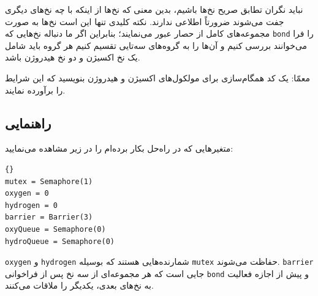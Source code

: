 \documentclass{book}
\newcommand{\clearemptydoublepage}{\newpage\cleardoublepage}
\begin{document}
    نباید نگران تطابق صریح نخ‌ها باشیم،‌ بدین معنی که نخ‌ها  از اینکه با چه نخ‌های دیگری جفت می‌شوند ضرورتاً  اطلاعی ندارند. نکته کلیدی تنها این است 
    نخ‌ها به صورت مجموعه‌های کامل از حصار عبور می‌نمایند؛ بنابراین اگر ما دنباله نخ‌هایی که {\tt bond} را فرا می‌خوانند بررسی کنیم و آن‌ها را به گروه‌های 
    سه‌تایی تقسیم کنیم هر گروه باید شامل یک نخ اکسیژن و دو نخ هیدروژن باشد. 

    معمّا:‌ یک کد همگام‌سازی برای مولکول‌های اکسیژن و هیدروژن بنویسید که این شرایط را برآورده نمایند. 


\clearemptydoublepage
\subsection {راهنمایی }

    متغیرهایی که در راه‌حل بکار برده‌ام را در زیر مشاهده می‌نمایید:

\begin{latin}
\begin{lstlisting}[title=\rl{راهنمایی ساخت آب}]{}
mutex = Semaphore(1)
oxygen = 0
hydrogen = 0
barrier = Barrier(3)
oxyQueue = Semaphore(0)
hydroQueue = Semaphore(0)
\end{lstlisting}
\end{latin}

    {\tt oxygen} و {\tt hydrogen} شمارنده‌هایی هستند که بوسیله {\tt mutex} حفاظت می‌شوند. {\tt barrier} 
    جایی است که هر مجموعه‌ای از سه نخ پس از فراخوانی {\tt bond} و پیش از اجازه فعالیت به نخ‌های بعدی، یکدیگر را ملاقات می‌کنند. 
    
\end{document}
